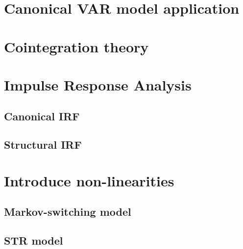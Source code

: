 \documentclass[hidelinks,12pts]{article}
\DeclareMathOperator{\1}{\mathbbm{1}}
\begin{document}
\newpage
\newpage
\section{Canonical VAR model application}\label{sec:var}



\section{Cointegration theory}\label{sec:cointegration}



\newpage
\section{Impulse Response Analysis}\label{sec:irf}
    \subsection{Canonical IRF}\label{sec:canonical_irf}


    \subsection{Structural IRF}\label{sec:structural_irf}


\newpage
\section{Introduce non-linearities}\label{sec:nonlinearities}
    \subsection{Markov-switching model}\label{sec:markov}

    
    \subsection{STR model}\label{sec:str}



    
\end{document}
